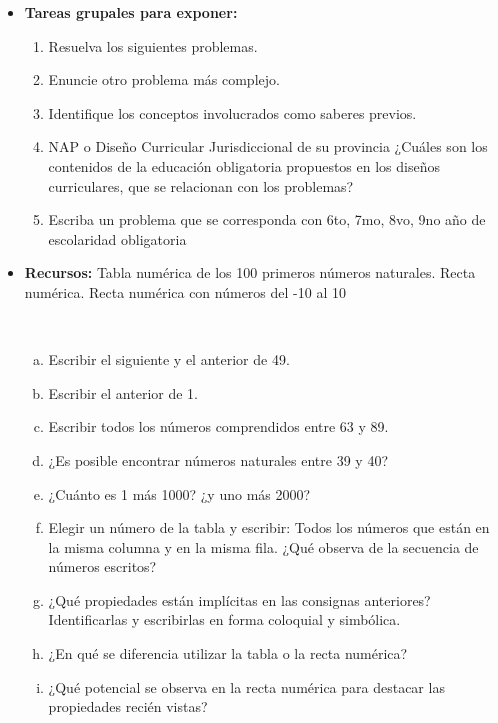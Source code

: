 \begin{itemize}
	\item \textbf{Tareas grupales para exponer:}
	\begin{enumerate}
		\item Resuelva los siguientes problemas.
		\item Enuncie otro problema más complejo.
		\item Identifique los conceptos involucrados como saberes previos.
		\item NAP o Diseño Curricular Jurisdiccional de su provincia ¿Cuáles son los contenidos de la educación obligatoria propuestos en los diseños curriculares, que se relacionan con los problemas?
		\item Escriba un problema que se corresponda con 6to, 7mo, 8vo, 9no año de escolaridad obligatoria
	\end{enumerate}
	
	\item \textbf{Recursos:} Tabla numérica de los 100 primeros números naturales. Recta numérica. Recta numérica con números del -10 al 10
	
	\begin{actividad}
		~
		\begin{enumerate}[a.]
			\item Escribir el siguiente y el anterior de 49.
			\item Escribir el anterior de 1.
			\item Escribir todos los números comprendidos entre 63 y 89.
			\item ¿Es posible encontrar números naturales entre 39 y 40?
			\item ¿Cuánto es 1 más 1000? ¿y uno más 2000?
			\item Elegir un número de la tabla y escribir: Todos los números que están en la misma columna y en la misma fila. ¿Qué observa de la secuencia de números escritos?
			\item ¿Qué propiedades están implícitas en las consignas anteriores? Identificarlas y escribirlas en forma coloquial y simbólica.
			\item ¿En qué se diferencia utilizar la tabla o la recta numérica?
			\item ¿Qué potencial se observa en la recta numérica para destacar las propiedades recién
			vistas?
		\end{enumerate}
	\end{actividad}
\end{itemize}

